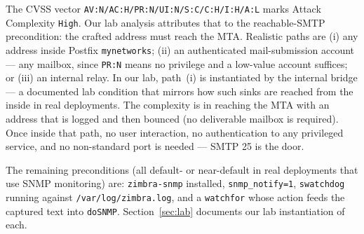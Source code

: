 \documentclass[journal]{IEEEtran}
\begin{document}
The CVSS vector \texttt{AV:N/\hspace{0pt}AC:H/\hspace{0pt}PR:N/\hspace{0pt}UI:N/\hspace{0pt}S:C/\hspace{0pt}C:H/\hspace{0pt}I:H/\hspace{0pt}A:L} marks
Attack Complexity \texttt{High}. Our lab analysis attributes that to the
reachable-SMTP precondition: the crafted address must reach the MTA.
Realistic paths are (i) any address inside Postfix \texttt{mynetworks};
(ii) an authenticated mail-submission account — any mailbox, since
\texttt{PR:N} means no privilege and a low-value account suffices; or
(iii) an internal relay. In our lab, path~(i) is instantiated by the
internal bridge — a documented lab condition that mirrors how such sinks
are reached from the inside in real deployments.
The complexity is in reaching the MTA with an address that is logged and
then bounced (no deliverable mailbox is required). Once inside that path,
no user interaction, no authentication to any privileged service, and no
non-standard port is needed — SMTP 25 is the door.

The remaining preconditions (all default- or near-default in real
deployments that use SNMP monitoring) are: \texttt{zimbra-snmp} installed,
\texttt{snmp\_notify=1}, \texttt{swatchdog} running against
\texttt{/var/log/zimbra.log}, and a \texttt{watchfor} whose action feeds the
captured text into \texttt{doSNMP}. Section~\ref{sec:lab} documents our lab
instantiation of each.
\end{document}
